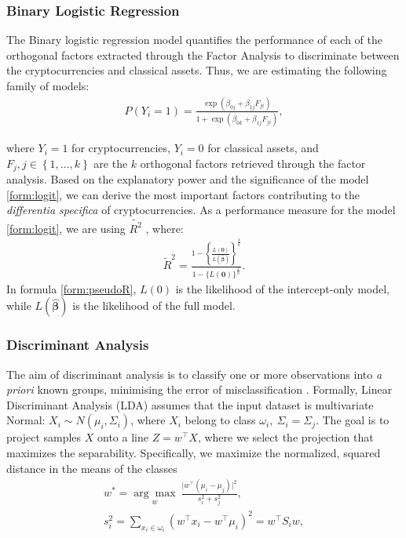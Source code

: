 \subsubsection{Binary Logistic Regression}
 The Binary logistic regression model quantifies the performance of each of the orthogonal factors extracted through the Factor Analysis to discriminate between the cryptocurrencies and classical assets. Thus, we are estimating the following family of models:
\begin{align} \label{form:logit}
P(Y_{i}=1)=\frac{\exp(\beta_{0 j}+\beta_{1 j} F_{j i})}{1+\exp(\beta_{0 k}+\beta_{1 j} F_{j i})},
\end{align}

where $Y_{i}=1$ for cryptocurrencies, $Y_{i}=0$ for classical assets, and $F_j, j\in\left\{1,\ldots,k\right\}$ are the $k$ orthogonal factors retrieved through the factor analysis. Based on the explanatory power and the significance of the model \ref{form:logit}, we can derive the most important factors contributing to the \textit{differentia specifica} of cryptocurrencies.
As a performance measure for the model \ref{form:logit}, we are using $\tilde{R^2}$ \citep{NAGELKERKE.1991}, where:
\begin{align} \label{form:pseudoR}
\tilde{R}^{2}=\frac{1-\left\{\frac{L(\mathbf{0})}{L(\widehat{\boldsymbol{\beta}})}\right\}^{\frac{2}{n}}}{1-\{L(\mathbf{0})\}^{\frac{2}{n}}}.
\end{align}
In formula \ref{form:pseudoR},  $L(0)$ is the likelihood of the intercept-only model, while  $L(\widehat{\boldsymbol{\beta}})$ is the likelihood of the full model.



\subsubsection{Discriminant Analysis}
The aim of discriminant analysis is to classify one or more observations into \textit{a priori} known groups, minimising the error of misclassification \citep{Hardle.2012}.
Formally, Linear Discriminant Analysis (LDA) assumes that the input dataset is multivariate Normal: $X_i\sim N(\mu_i,\Sigma_i)$, where $X_i$ belong to class $\omega_i,\ \Sigma_i=\Sigma_j$. The goal is to project samples $X$ onto a line $Z = w^\top X$, where we select the projection that maximizes the separability. Specifically, we maximize the normalized, squared distance in the means of the classes
  \begin{align}
  w^\ast=\underset{w}{\arg\max}\ \frac{\vert w^\top(\mu_i-\mu_j)\vert^2}{s_i^2+s_j^2},\\
  s_i^2=\sum_{x_i\in\omega_i}(w^\top x_i-w^\top \mu_i)^2=w^\top S_i w,
  \end{align}
  

